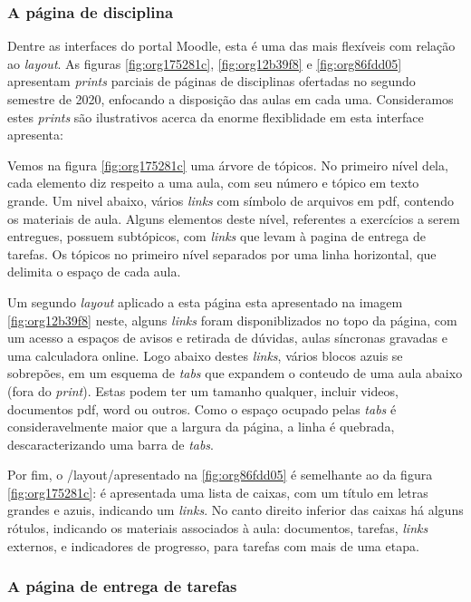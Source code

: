 \documentclass[11pt]{article}
\begin{document}
\subsubsection*{A página de disciplina}
\label{sec:org5ecd2c6}
Dentre as interfaces do portal Moodle, esta é uma das mais flexíveis
com relação ao \emph{layout}.  As figuras \ref{fig:org175281c}, \ref{fig:org12b39f8} e
\ref{fig:org86fdd05} apresentam \emph{prints} parciais de páginas de disciplinas
ofertadas no segundo semestre de 2020, enfocando a disposição das
aulas em cada uma. Consideramos estes \emph{prints} são ilustrativos acerca
da enorme flexiblidade em esta interface apresenta:

Vemos na figura \ref{fig:org175281c} uma árvore de tópicos. No primeiro nível
dela, cada elemento diz respeito a uma aula, com seu número e tópico
em texto grande.  Um nivel abaixo, vários \emph{links} com símbolo de
arquivos em pdf, contendo os materiais de aula.  Alguns elementos
deste nível, referentes a exercícios a serem entregues, possuem
subtópicos, com \emph{links} que levam à pagina de entrega de tarefas.  Os
tópicos no primeiro nível separados por uma linha horizontal, que
delimita o espaço de cada aula.

Um segundo \emph{layout} aplicado a esta página esta apresentado na imagem
\ref{fig:org12b39f8} neste, alguns \emph{links} foram disponiblizados no topo da
página, com um acesso a espaços de avisos e retirada de dúvidas, aulas
síncronas gravadas e uma calculadora online. Logo abaixo destes \emph{links},
vários blocos azuis se sobrepões, em um esquema de \emph{tabs} que expandem
o conteudo de uma aula abaixo (fora do \emph{print}). Estas podem ter um
tamanho qualquer, incluir videos, documentos pdf, word ou outros. Como
o espaço ocupado pelas \emph{tabs} é consideravelmente maior que a largura
da página, a linha é quebrada, descaracterizando uma barra de \emph{tabs}.

Por fim, o /layout/apresentado na \ref{fig:org86fdd05} é semelhante ao da figura
\ref{fig:org175281c}: é apresentada uma lista de caixas, com um título em letras
grandes e azuis, indicando um \emph{links}. No canto direito inferior das
caixas há alguns rótulos, indicando os materiais associados à aula:
documentos, tarefas, \emph{links} externos, e indicadores de progresso,
para tarefas com mais de uma etapa.

\subsubsection*{A página de entrega de tarefas}
\label{sec:org0f26a70}
\end{document}
